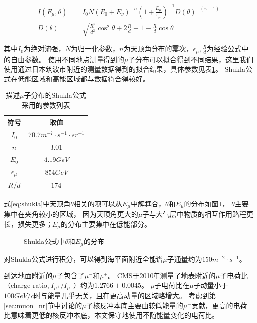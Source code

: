 \begin{align}
    \label{eq:shukla}
    I\left(E_\mu,\theta\right) &= I_0 N\left(E_0+E_\nu\right)^{-n}\left(1 + \frac{E_\mu}{\epsilon_\mu}\right)^{-1}D(\theta)^{-(n-1)} \\
    D(\theta) &= \sqrt{\frac{R^2}{d^2}\cos^2\theta+2\frac{R}{d}+1}-\frac{R}{d}\cos\theta
\end{align}

其中$I_0$为绝对流强，$N$为归一化参数，$n$为天顶角分布的幂次，$\epsilon_\mu,\frac{R}{d}$为经验公式中的自由参数。
使用不同地点测量得到的$\mu$子分布可以拟合得到不同结果，这里我们使用通过日本筑波市附近的测量数据得到的拟合结果，具体参数见表\ref{tab:shukla}。
Shukla公式在低能区域和高能区域都与数据符合得较好。

\begin{table}
  \centering
  \caption{描述$\mu$子分布的Shukla公式采用的参数列表}
  \begin{tabular}{cc}
    \toprule
    符号 & 取值 \\
    \midrule
    $I_0$ & $70.7\si{m^{-2}\cdot s^{-1}\cdot sr^{-1}}$ \\
    $n$ & 3.01 \\
    $E_0$ & $4.19\si{GeV}$ \\
    $\epsilon_\mu$ & $854\si{GeV}$ \\
    $R/d$ & $174$ \\
    \bottomrule
  \end{tabular}
  \label{tab:shukla}
\end{table}

式\ref{eq:shukla}中天顶角$\theta$相关的项可以从$E_\mu$中解耦合，$\theta$和$E_\mu$的分布如图\ref{fig:shukla_distribution}，
$\theta$主要集中在夹角较小的区域，
因为天顶角更大的$\mu$子与大气层中物质的相互作用路程更长，损失更多；$E_\mu$的分布主要集中在低能部分。

\begin{figure}
    \centering
    
    \caption{\label{fig:shukla_distribution} Shukla公式中$\theta$和$E_\mu$的分布}
\end{figure}

对Shukla公式进行积分，可以得到海平面附近全能谱$\mu$子通量约为$150\si{m^{-2}\cdot s^{-1}}$。

到达地面附近的$\mu$子包含了$\mu^-$和$\mu^+$。
CMS于2010年测量了地表附近的$\mu$子电荷比（charge ratio, $I_{\mu^+}/I_{\mu^-}$）约为$1.2766\pm0.0045$\cite{the_cms_collaboration_measurement_2010}。
$\mu$子电荷比在$\mu$子动量小于$100\si{GeV/c}$时与能量几乎无关，且在更高动量的区域略增大。
考虑到第\ref{sec:muon_nr}节中讨论的$\mu$子核反冲本底主要由较低能量的$\mu^-$贡献，更高的电荷比意味着更低的核反冲本底，本文保守地使用不随能量变化的电荷比。

